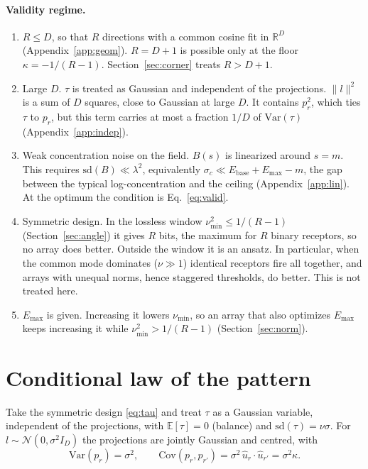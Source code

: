 \documentclass[11pt,a4paper]{article}
\newcommand{\RR}{\mathbb{R}}
\newcommand{\EE}{\mathbb{E}}
\newcommand{\Var}{\mathrm{Var}}
\newcommand{\Cov}{\mathrm{Cov}}
\newcommand{\sd}{\mathrm{sd}}
\newcommand{\Ebase}{E_{\mathrm{base}}}
\newcommand{\Emax}{E_{\mathrm{max}}}
\newcommand{\uhat}{\hat{u}}
\begin{document}
\paragraph{Validity regime.}
\begin{enumerate}[label=(\roman*)]
\item $R\le D$, so that $R$ directions with a common cosine fit in $\RR^D$
  (Appendix~\ref{app:geom}). $R=D+1$ is possible only at the floor $\kappa=-1/(R-1)$.
  Section~\ref{sec:corner} treats $R>D+1$.
\item Large $D$. $\tau$ is treated as Gaussian and independent of the projections.
  $\|l\|^2$ is a sum of $D$ squares, close to Gaussian at large $D$. It contains $p_r^2$,
  which ties $\tau$ to $p_r$, but this term carries at most a fraction $1/D$ of $\Var(\tau)$
  (Appendix~\ref{app:indep}).
\item Weak concentration noise on the field. $B(s)$ is linearized around $s=m$. This
  requires $\sd(B)\ll\lambda^2$, equivalently $\sigma_c\ll\Ebase+\Emax-m$, the gap between
  the typical log-concentration and the ceiling (Appendix~\ref{app:lin}). At the optimum
  the condition is Eq.~\eqref{eq:valid}.
\item Symmetric design. In the lossless window $\nu_{\min}^2\le1/(R-1)$
  (Section~\ref{sec:angle}) it gives $R$ bits, the maximum for $R$ binary receptors, so no
  array does better. Outside the window it is an ansatz. In particular, when the common
  mode dominates ($\nu\gg1$) identical receptors fire all together, and arrays with
  unequal norms, hence staggered thresholds, do better. This is not treated here.
\item $\Emax$ is given. Increasing it lowers $\nu_{\min}$, so an array that also optimizes
  $\Emax$ keeps increasing it while $\nu_{\min}^2>1/(R-1)$ (Section~\ref{sec:norm}).
\end{enumerate}

\section{Conditional law of the pattern}
\label{sec:law}

Take the symmetric design \eqref{eq:tau} and treat $\tau$ as a Gaussian variable,
independent of the projections, with $\EE[\tau]=0$ (balance) and $\sd(\tau)=\nu\sigma$.
For $l\sim\mathcal N(0,\sigma^2I_D)$ the projections are jointly Gaussian and centred, with
\begin{equation}
  \Var(p_r)=\sigma^2,
  \qquad
  \Cov(p_r,p_{r'})=\sigma^2\,\uhat_r\cdot\uhat_{r'}=\sigma^2\kappa .
  \label{eq:gram}
\end{equation}
\end{document}
